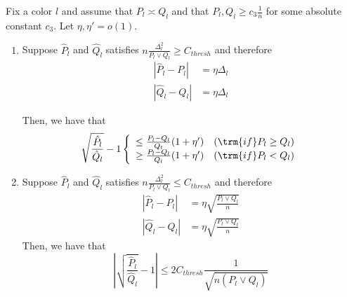 \documentclass{article}
\begin{document}
\begin{lemma}
\label{lem:sqrt_ratio_pl_ql_minus_1}
Fix a color $l$ and assume that $P_l \asymp Q_l$ and that $P_l, Q_l \geq c_3 \frac{1}{n}$ for some absolute constant $c_3$. Let $\eta, \eta' = o(1)$. 
\begin{enumerate}
\item 
Suppose $\hat{P}_l$ and $\hat{Q}_l$ satisfies $n \frac{\Delta_l^2}{P_l \vee Q_l} \geq C_{thresh}$ and therefore
\begin{align*}
| \hat{P}_l - P_l | &= \eta \Delta_l  \\
| \hat{Q}_l - Q_l | &= \eta \Delta_l  
\end{align*}

Then, we have that 
\[
\sqrt{ \frac{\hat{P}_l }{\hat{Q}_l} } - 1 \left\{ \begin{array}{cc} 
                    \leq \frac{P_l - Q_l}{Q_l} (1 + \eta') & (\trm{if }  P_l \geq Q_l) \\
                    \geq \frac{P_l - Q_l}{Q_l} (1 + \eta') & (\trm{if } P_l < Q_l) 
           \end{array} \right.
\]

\item
Suppose $\hat{P}_l$ and $\hat{Q}_l$ satisfies $n \frac{\Delta_l^2}{P_l \vee Q_l} \leq C_{thresh}$ and therefore
\begin{align*}
| \hat{P}_l - P_l | &= \eta \sqrt{ \frac{P_l \vee Q_l}{n} } \\
| \hat{Q}_l - Q_l | &= \eta \sqrt{ \frac{P_l \vee Q_l}{n} }
\end{align*}
Then, we have that
\[
\left| \sqrt{ \frac{\hat{P}_l}{\hat{Q}_l} } - 1 \right| \leq
 2 C_{thresh} \frac{1}{\sqrt{n  (P_l \vee Q_l) } }
\]

\end{enumerate}
\end{lemma}
\end{document}

